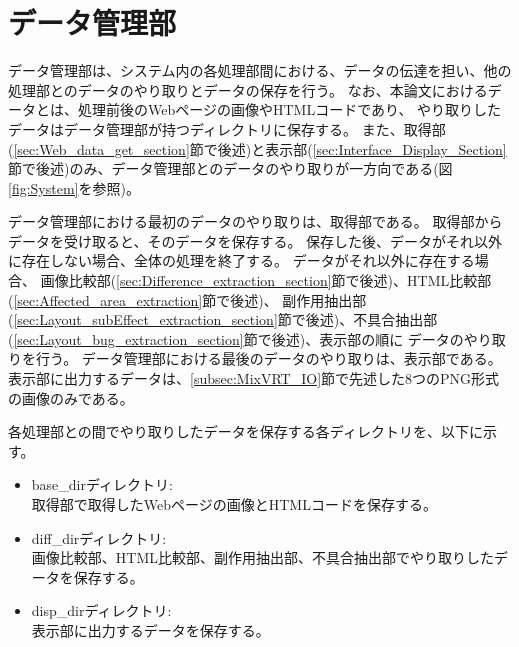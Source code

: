 \section{データ管理部}\label{sec:data_admin_section}
データ管理部は、システム内の各処理部間における、データの伝達を担い、他の処理部とのデータのやり取りとデータの保存を行う。
なお、本論文におけるデータとは、処理前後のWebページの画像やHTMLコードであり、
やり取りしたデータはデータ管理部が持つディレクトリに保存する。
また、取得部(\ref{sec:Web_data_get_section}節で後述)と表示部(\ref{sec:Interface_Display_Section}節で後述)のみ、データ管理部とのデータのやり取りが一方向である(図\ref{fig:System}を参照)。
\par
データ管理部における最初のデータのやり取りは、取得部である。
取得部からデータを受け取ると、そのデータを保存する。
保存した後、データがそれ以外に存在しない場合、全体の処理を終了する。
データがそれ以外に存在する場合、
画像比較部(\ref{sec:Difference_extraction_section}節で後述)、HTML比較部(\ref{sec:Affected_area_extraction}節で後述)、
副作用抽出部(\ref{sec:Layout_subEffect_extraction_section}節で後述)、不具合抽出部(\ref{sec:Layout_bug_extraction_section}節で後述)、表示部の順に
データのやり取りを行う。
データ管理部における最後のデータのやり取りは、表示部である。
表示部に出力するデータは、\ref{subsec:MixVRT_IO}節で先述した8つのPNG形式の画像のみである。
\par
各処理部との間でやり取りしたデータを保存する各ディレクトリを、以下に示す。
\begin{itemize}
    \item base\_dirディレクトリ:\\
          取得部で取得したWebページの画像とHTMLコードを保存する。
    \item diff\_dirディレクトリ:\\
          画像比較部、HTML比較部、副作用抽出部、不具合抽出部でやり取りしたデータを保存する。
    \item disp\_dirディレクトリ:\\
          表示部に出力するデータを保存する。
\end{itemize}

